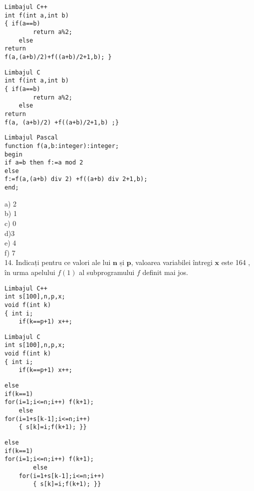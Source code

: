 \begin{verbatim}
Limbajul C++
int f(int a,int b)
{ if(a==b)
        return a%2;
    else
return
f(a,(a+b)/2)+f((a+b)/2+1,b); }
\end{verbatim}

\begin{verbatim}
Limbajul C
int f(int a,int b)
{ if(a==b)
        return a%2;
    else
return
f(a, (a+b)/2) +f((a+b)/2+1,b) ;}
\end{verbatim}

\begin{verbatim}
Limbajul Pascal
function f(a,b:integer):integer;
begin
if a=b then f:=a mod 2
else
f:=f(a,(a+b) div 2) +f((a+b) div 2+1,b);
end;
\end{verbatim}

a) 2\\
b) 1\\
c) 0\\
d)3\\
e) 4\\
f) 7\\
14. Indicați pentru ce valori ale lui $\mathbf{n}$ și $\mathbf{p}$, valoarea variabilei întregi $\mathbf{x}$ este 164 , în urma apelului $f(1)$ al subprogramului $f$ definit mai jos.

\begin{verbatim}
Limbajul C++
int s[100],n,p,x;
void f(int k)
{ int i;
    if(k==p+1) x++;
\end{verbatim}

\begin{verbatim}
Limbajul C
int s[100],n,p,x;
void f(int k)
{ int i;
    if(k==p+1) x++;
\end{verbatim}

\begin{verbatim}
else
if(k==1)
for(i=1;i<=n;i++) f(k+1);
    else
for(i=1+s[k-1];i<=n;i++)
    { s[k]=i;f(k+1); }}
\end{verbatim}

\begin{verbatim}
else
if(k==1)
for(i=1;i<=n;i++) f(k+1);
        else
    for(i=1+s[k-1];i<=n;i++)
        { s[k]=i;f(k+1); }}
\end{verbatim}

